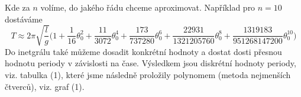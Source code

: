 \documentclass[reqno, a4paper]{amsart}
\begin{document}
		\begin{verbatim*}
			
			k=Sin[\[Theta]/2]
			Series[1/(Sqrt[1-k^2*(Sin[x])^2]),{\[Theta],0,4}]
			Integrate[4*Sqrt[l/g]*Series[1/(Sqrt[1-k^2*(Sin[x])^2]),{\[Theta],0,n}],{x,0,Pi/2}]
			
		\end{verbatim*}
		Kde za $ n $ volíme, do jakého řádu chceme aproximovat. Například pro $ n=10 $ dostáváme
		\begin{equation*}
			T
			\approx
			2 \pi \sqrt{\frac{l}{g}} \bigg(  1 +\frac{1}{16}\theta_{0} ^2+\frac{11}{3072}\theta_{0} ^4+\frac{173}{737280} \theta_{0} ^6 +\frac{22931}{1321205760} \theta_{0} ^8 
			+\frac{1319183}{951268147200} \theta_{0} ^{10} \bigg)
		\end{equation*}
		Do inetgrálu také můžeme dosadit konkrétní hodnoty a dostat dosti přesnou hodnotu periody v závislosti na čase. Výsledkem jsou diskrétní hodnoty periody, viz. tabulka (1), které jsme následně proložily polynomem (metoda nejmenších čtverců), viz. graf (1). 
		\vspace{5mm}
\end{document}
